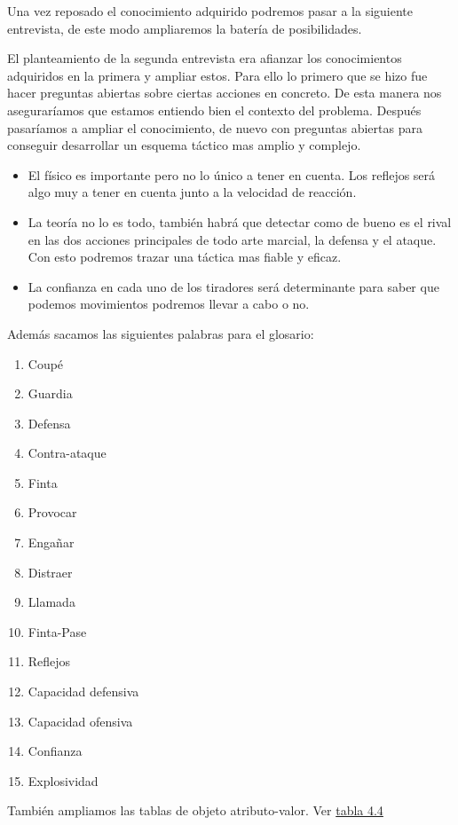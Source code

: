 Una vez reposado el conocimiento adquirido podremos pasar a la siguiente entrevista,
de este modo ampliaremos la batería de posibilidades.

El planteamiento de la segunda entrevista era afianzar los conocimientos adquiridos en
la primera y ampliar estos. Para ello lo primero que se hizo fue hacer preguntas abiertas
sobre ciertas acciones en concreto. De esta manera nos aseguraríamos que estamos entiendo
bien el contexto del problema. Después pasaríamos a ampliar el conocimiento, de nuevo
con preguntas abiertas para conseguir desarrollar un esquema táctico mas amplio y complejo.

\begin{itemize}
  \item El físico es importante pero no lo único a tener en cuenta. Los reflejos será
    algo muy a tener en cuenta junto a la velocidad de reacción.
  \item La teoría no lo es todo, también habrá que detectar como de bueno es el rival
    en las dos acciones principales de todo arte marcial, la defensa y el ataque.
    Con esto podremos trazar una táctica mas fiable y eficaz.
  \item La confianza en cada uno de los tiradores será determinante para saber
    que podemos movimientos podremos llevar a cabo o no.
\end{itemize}

Además sacamos las siguientes palabras para el glosario:

\begin{enumerate}
  \item Coupé
  \item Guardia
  \item Defensa
  \item Contra-ataque
  \item Finta
  \item Provocar
  \item Engañar
  \item Distraer
  \item Llamada
  \item Finta-Pase
  \item Reflejos
  \item Capacidad defensiva
  \item Capacidad ofensiva
  \item Confianza
  \item Explosividad
\end{enumerate}

También ampliamos las tablas de objeto atributo-valor. Ver \hyperref[tab:Tabla objeto atributo y valor ampliada]{tabla 4.4}

